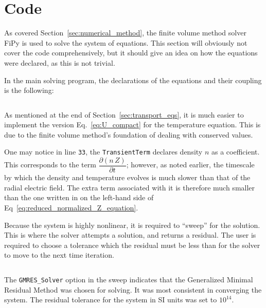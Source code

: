 \chapter{Code}\label{chapter:Code}
As covered Section~\ref{sec:numerical_method}, the finite volume method solver FiPy \cite{guyer_fipy:_2009} is used to solve the system of equations.
This section will obviously not cover the code comprehensively, but it should give an idea on how the equations were declared, as this is not trivial.

In the main solving program, the declarations of the equations and their coupling is the following:
\inputminted[firstline=22, lastline=43, tabsize=4, breaklines=true, fontsize=\footnotesize, frame=single, linenos=true]{python}{../FiPy_Model/solving_flux.py}
As mentioned at the end of Section~\ref{sec:transport_eqs}, it is much easier to implement the version Eq.~\ref{eq:U_compact} for the temperature equation.
This is due to the finite volume method's foundation of dealing with conserved values.

One may notice in line \texttt{33}, the \texttt{TransientTerm} declares density $n$ as a coefficient.
This corresponds to the term $\dfrac{\partial (n \, Z)}{\partial t}$; however, as noted earlier, the timescale by which the density and temperature evolves is much slower than that of the radial electric field.
The extra term associated with it is therefore much smaller than the one written in on the left-hand side of Eq~\ref{eq:reduced_normalized_Z_equation}.

Because the system is highly nonlinear, it is required to ``sweep'' for the solution.
This is where the solver attempts a solution, and returns a residual.
The user is required to choose a tolerance which the residual must be less than for the solver to move to the next time iteration.
\inputminted[firstline=98, lastline=113, tabsize=4, breaklines=true, fontsize=\footnotesize, frame=single, linenos=true]{python}{../FiPy_Model/solving_flux.py}

The \texttt{GMRES_Solver} option in the sweep indicates that the Generalized Minimal Residual Method was chosen for solving.
It was most consistent in converging the system.
The residual tolerance for the system in SI units was set to $10^{14}$.

